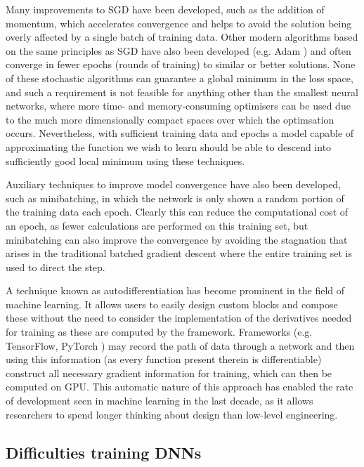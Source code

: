 Many improvements to SGD have been developed, such as the addition of momentum, which accelerates convergence and helps to avoid the solution being overly affected by a single batch of training data.
Other modern algorithms based on the same principles as SGD have also been developed (e.g. Adam \citet{2014Kingma}) and often converge in fewer epochs (rounds of training) to similar or better solutions.
None of these stochastic algorithms can guarantee a global minimum in the loss space, and such a requirement is not feasible for anything other than the smallest neural networks, where more time- and memory-consuming optimisers can be used due to the much more dimensionally compact spaces over which the optimsation occurs.
Nevertheless, with sufficient training data and epochs a model capable of approximating the function we wish to learn should be able to descend into sufficiently good local minimum using these techniques.

Auxiliary techniques to improve model convergence have also been developed, such as minibatching, in which the network is only shown a random portion of the training data each epoch.
Clearly this can reduce the computational cost of an epoch, as fewer calculations are performed on this training set, but minibatching can also improve the convergence by avoiding the stagnation that arises in the traditional batched gradient descent where the entire training set is used to direct the step.

A technique known as autodifferentiation has become prominent in the field of machine learning.
It allows users to easily design custom blocks and compose these without the need to consider the implementation of the derivatives needed for training as these are computed by the framework.
Frameworks (e.g. TensorFlow, PyTorch \NeedRef{}) may record the path of data through a network and then using this information (as every function present therein is differentiable) construct all necessary gradient information for training, which can then be computed on GPU.
This automatic nature of this approach has enabled the rate of development seen in machine learning in the last decade, as it allows researchers to spend longer thinking about design than low-level engineering.

\subsection{Difficulties training DNNs}

